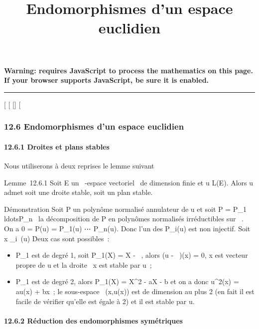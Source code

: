 \documentclass[]{article}
\title{Endomorphismes d'un espace euclidien}
\author{}
\date{}
\begin{document}
\maketitle

\textbf{Warning: 
requires JavaScript to process the mathematics on this page.\\ If your
browser supports JavaScript, be sure it is enabled.}

\begin{center}\rule{3in}{0.4pt}\end{center}

[
[
[]
[

\subsubsection{12.6 Endomorphismes d'un espace euclidien}

\paragraph{12.6.1 Droites et plans stables}

Nous utiliserons à deux reprises le lemme suivant

Lemme~12.6.1 Soit E un ~-espace vectoriel ~de dimension finie et u \in
L(E). Alors u admet soit une droite stable, soit un plan stable.

Démonstration Soit P un polynôme normalisé annulateur de u et soit P =
P_1\\ldotsP_n~
la décomposition de P en polynômes normalisés irréductibles sur ~. On a
0 = P(u) = P_1(u) \cdot⋯ \cdot
P_n(u). Donc l'un des P_i(u) est non injectif. Soit x
\in\mathrmKerP_i~(u)
\diagdown\0\. Deux cas sont possibles~:

\begin{itemize}
\itemsep1pt\parskip0pt
\item
  P_1 est de degré 1, soit P_1(X) = X - \lambda~, alors (u -
  \lambda~\mathrmId)(x) = 0, x est vecteur propre de u et la
  droite ~x est stable par u~;
\item
  P_1 est de degré 2, alors P_1(X) = X^2 -
  aX - b et on a donc u^2(x) = au(x) + bx~; le sous-espace
  \mathrmVect~(x,u(x)) est
  de dimension au plus 2 (en fait il est facile de vérifier qu'elle est
  égale à 2) et il est stable par u.
\end{itemize}

\paragraph{12.6.2 Réduction des endomorphismes symétriques}
\end{document}
